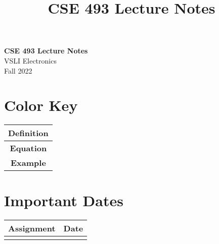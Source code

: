\documentclass[11pt]{lectures}
\begin{document}
\setcounter{section}{8}
\title{CSE 493 Lecture Notes}

\thispagestyle{empty}

\begin{center}
{\LARGE \bf CSE 493 Lecture Notes}\\
{\large VSLI Electronics}\\
Fall 2022
\end{center}

\begin{multicols}{2}
\section*{Color Key}
\begin{tabular}{|c|}
    \hline
     \colorbox{defn}{\textbf{Definition}}\\
     \hline
     \colorbox{eqn}{\textbf{Equation}}\\
     \hline
     \colorbox{exam}{\textbf{Example}}\\
     \hline
\end{tabular}

\section*{Important Dates}
\begin{tabular}{|c|c|}
    \hline
    \textbf{Assignment} & \textbf{Date} \\
    \hline
    \hline
     & 
\end{tabular}
\end{multicols}
\end{document}
